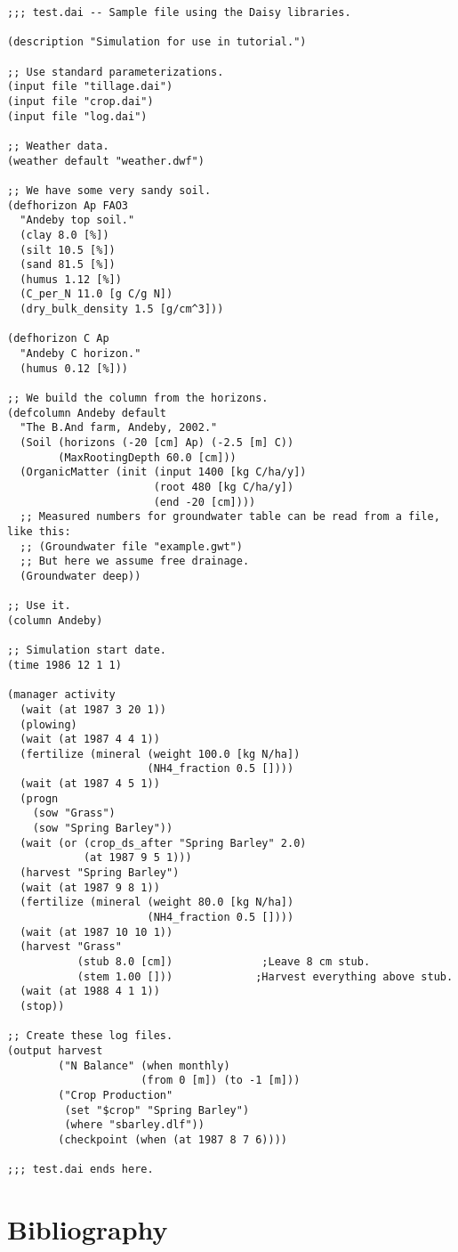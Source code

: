 \documentclass[a4paper,11pt]{article}
\begin{document}
\begin{verbatim}
;;; test.dai -- Sample file using the Daisy libraries.

(description "Simulation for use in tutorial.")

;; Use standard parameterizations.
(input file "tillage.dai")
(input file "crop.dai")
(input file "log.dai")

;; Weather data.
(weather default "weather.dwf")

;; We have some very sandy soil.
(defhorizon Ap FAO3
  "Andeby top soil."
  (clay 8.0 [%])
  (silt 10.5 [%])
  (sand 81.5 [%])
  (humus 1.12 [%])
  (C_per_N 11.0 [g C/g N])
  (dry_bulk_density 1.5 [g/cm^3]))

(defhorizon C Ap
  "Andeby C horizon."
  (humus 0.12 [%]))

;; We build the column from the horizons.
(defcolumn Andeby default
  "The B.And farm, Andeby, 2002."
  (Soil (horizons (-20 [cm] Ap) (-2.5 [m] C))
        (MaxRootingDepth 60.0 [cm]))
  (OrganicMatter (init (input 1400 [kg C/ha/y])
                       (root 480 [kg C/ha/y])
                       (end -20 [cm])))
  ;; Measured numbers for groundwater table can be read from a file, like this:
  ;; (Groundwater file "example.gwt")
  ;; But here we assume free drainage.
  (Groundwater deep))

;; Use it.
(column Andeby)

;; Simulation start date.
(time 1986 12 1 1)

(manager activity
  (wait (at 1987 3 20 1))
  (plowing)
  (wait (at 1987 4 4 1))
  (fertilize (mineral (weight 100.0 [kg N/ha])
                      (NH4_fraction 0.5 [])))
  (wait (at 1987 4 5 1))
  (progn
    (sow "Grass")
    (sow "Spring Barley"))
  (wait (or (crop_ds_after "Spring Barley" 2.0)
            (at 1987 9 5 1)))
  (harvest "Spring Barley")
  (wait (at 1987 9 8 1))
  (fertilize (mineral (weight 80.0 [kg N/ha])
                      (NH4_fraction 0.5 [])))
  (wait (at 1987 10 10 1))
  (harvest "Grass"
           (stub 8.0 [cm])              ;Leave 8 cm stub.
           (stem 1.00 []))             ;Harvest everything above stub.
  (wait (at 1988 4 1 1))
  (stop))

;; Create these log files.
(output harvest
        ("N Balance" (when monthly)
                     (from 0 [m]) (to -1 [m]))
        ("Crop Production"
         (set "$crop" "Spring Barley")
         (where "sbarley.dlf"))
        (checkpoint (when (at 1987 8 7 6))))

;;; test.dai ends here.
\end{verbatim}

\section{Bibliography}

\end{document}
